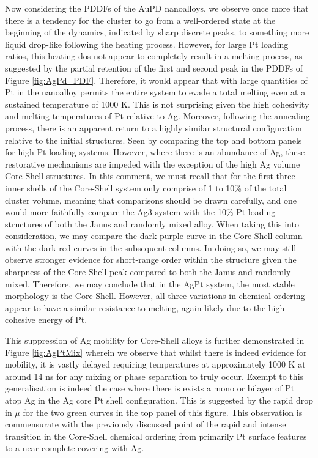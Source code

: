 Now considering the PDDFs of the AuPD nanoalloys, we observe once more that there is a tendency for the cluster to go from a well-ordered state at the beginning of the dynamics, indicated by sharp discrete peaks, to something more liquid drop-like following the heating process. However, for large Pt loading ratios, this heating dos not appear to completely result in a melting process, as suggested by the partial retention of the first and second peak in the PDDFs of Figure \ref{fig:AgPd_PDF}. Therefore, it would appear that with large quantities of Pt in the nanoalloy permits the entire system to evade a total melting even at a sustained temperature of 1000 K. This is not surprising given the high cohesivity and melting temperatures of Pt relative to Ag. Moreover, following the annealing process, there is an apparent return to a highly similar structural configuration relative to the initial structures. Seen by comparing the top and bottom panels for high Pt loading systems. However, where there is an abundance of Ag, these restorative mechanisms are impeded with the exception of the high Ag volume Core-Shell structures. In this comment, we must recall that for the first three inner shells of the Core-Shell system only comprise of 1 to 10\% of the total cluster volume, meaning that comparisons should be drawn carefully, and one would more faithfully compare the Ag3 system with the 10\% Pt loading structures of both the Janus and randomly mixed alloy. When taking this into consideration, we may compare the dark purple curve in the Core-Shell column with the dark red curves in the subsequent columns. In doing so, we may still observe stronger evidence for short-range order within the structure given the sharpness of the Core-Shell peak compared to both the Janus and randomly mixed. Therefore, we may conclude that in the AgPt system, the most stable morphology is the Core-Shell. However, all three variations in chemical ordering appear to have a similar resistance to melting, again likely due to the high cohesive energy of Pt.

This suppression of Ag mobility for Core-Shell alloys is further demonstrated in Figure \ref{fig:AgPtMix} wherein we observe that whilst there is indeed evidence for mobility, it is vastly delayed requiring temperatures at approximately 1000 K at around 14 ns for any mixing or phase separation to truly occur. Exempt to this generalisation is indeed the case where there is exists a mono or bilayer of Pt atop Ag in the Ag core Pt shell configuration. This is suggested by the rapid drop in $\mu$ for the two green curves in the top panel of this figure. This observation is commensurate with the previously discussed point of the rapid and intense transition in the Core-Shell chemical ordering from primarily Pt surface features to a near complete covering with Ag.

